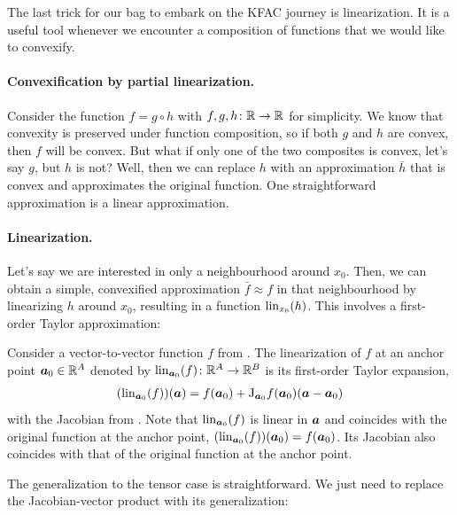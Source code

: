 The last trick for our bag to embark on the KFAC journey is linearization.
It is a useful tool whenever we encounter a composition of functions that we would like to convexify.

\paragraph{Convexification by partial linearization.}
Consider \eg the function $f = g \circ h$ with $f,g,h\colon {\mathbb{R}} \to {\mathbb{R}}$ for simplicity.
We know that convexity is preserved under function composition, so if both $g$ and $h$ are convex, then $f$ will be convex.
But what if only one of the two composites is convex, let's say $g$, but $h$ is not?
Well, then we can replace $h$ with an approximation $\bar{h}$ that is convex and approximates the original function.
One straightforward approximation is a linear approximation.

\paragraph{Linearization.} Let's say we are interested in only a neighbourhood around $x_0$.
Then, we can obtain a simple, convexified approximation $\bar{f} \approx f$ in that neighbourhood by linearizing $h$ around $x_0$, resulting in a function $\operatorname{lin}_{x_0}(h)$.
This involves a first-order Taylor approximation:

\begin{definition}\label{def:vector_linearization}
  Consider a vector-to-vector function $f$ from .
  The linearization of $f$ at an anchor point ${\bm{a}}_0 \in {\mathbb{R}}^A$ denoted by $\operatorname{lin}_{{\bm{a}}_0}(f)\colon {\mathbb{R}}^A \to {\mathbb{R}}^B$ is its first-order Taylor expansion,
  \begin{align*}
    (\operatorname{lin}_{{\bm{a}}_0}(f))({\bm{a}}) = f({\bm{a}}_0) + \mathrm{J}_{{\bm{a}}_0}f({\bm{a}}_0) ({\bm{a}} - {\bm{a}}_0)
  \end{align*}
  with the Jacobian from .
  Note that $\operatorname{lin}_{{\bm{a}}_0}(f)$ is linear in ${\bm{a}}$ and coincides with the original function at the anchor point, $(\operatorname{lin}_{{\bm{a}}_0}(f))({\bm{a}}_0) = f({\bm{a}}_0)$.
  Its Jacobian also coincides with that of the original function at the anchor point.
\end{definition}

The generalization to the tensor case is straightforward.
We just need to replace the Jacobian-vector product with its generalization:


